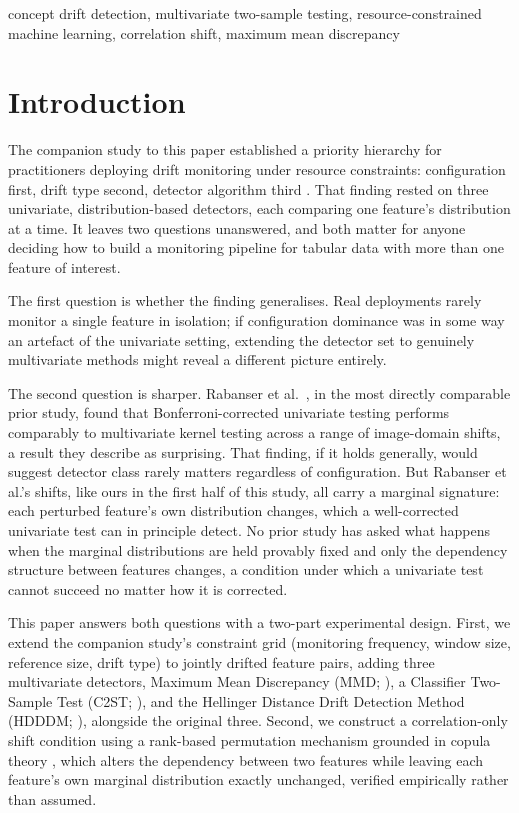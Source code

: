 \documentclass[conference]{IEEEtran}
\begin{document}
\begin{IEEEkeywords}
concept drift detection, multivariate two-sample testing, resource-constrained machine learning, correlation shift, maximum mean discrepancy
\end{IEEEkeywords}

\section{Introduction}

The companion study to this paper established a priority hierarchy for practitioners deploying drift monitoring under resource constraints: configuration first, drift type second, detector algorithm third \cite{paper1self}. That finding rested on three univariate, distribution-based detectors, each comparing one feature's distribution at a time. It leaves two questions unanswered, and both matter for anyone deciding how to build a monitoring pipeline for tabular data with more than one feature of interest.

The first question is whether the finding generalises. Real deployments rarely monitor a single feature in isolation; if configuration dominance was in some way an artefact of the univariate setting, extending the detector set to genuinely multivariate methods might reveal a different picture entirely.

The second question is sharper. Rabanser et al.~\cite{rabanser2019}, in the most directly comparable prior study, found that Bonferroni-corrected univariate testing performs comparably to multivariate kernel testing across a range of image-domain shifts, a result they describe as surprising. That finding, if it holds generally, would suggest detector class rarely matters regardless of configuration. But Rabanser et al.'s shifts, like ours in the first half of this study, all carry a marginal signature: each perturbed feature's own distribution changes, which a well-corrected univariate test can in principle detect. No prior study has asked what happens when the marginal distributions are held provably fixed and only the dependency structure between features changes, a condition under which a univariate test cannot succeed no matter how it is corrected.

This paper answers both questions with a two-part experimental design. First, we extend the companion study's constraint grid (monitoring frequency, window size, reference size, drift type) to jointly drifted feature pairs, adding three multivariate detectors, Maximum Mean Discrepancy (MMD; \cite{gretton2012}), a Classifier Two-Sample Test (C2ST; \cite{lopezpaz2017}), and the Hellinger Distance Drift Detection Method (HDDDM; \cite{ditzler2011}), alongside the original three. Second, we construct a correlation-only shift condition using a rank-based permutation mechanism grounded in copula theory \cite{sklar1959}, which alters the dependency between two features while leaving each feature's own marginal distribution exactly unchanged, verified empirically rather than assumed.
\end{document}
